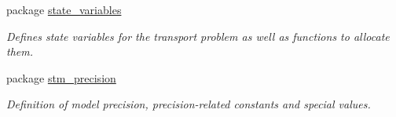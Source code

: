 \begin{CompactItemize}
\item 
package \hyperlink{a00037}{state\_\-variables}
\begin{CompactList}\small\item\em Defines state variables for the transport problem as well as functions to allocate them. \item\end{CompactList}

\item 
package \hyperlink{a00038}{stm\_\-precision}
\begin{CompactList}\small\item\em Definition of model precision, precision-related constants and special values. \item\end{CompactList}

\end{CompactItemize}
